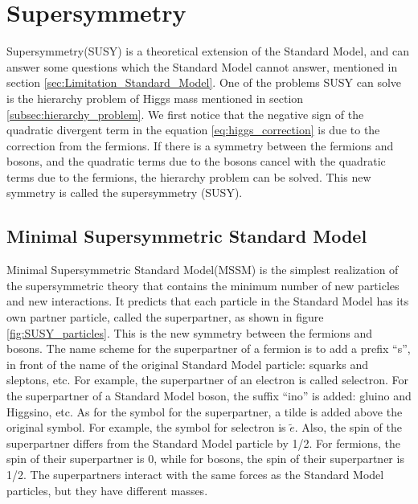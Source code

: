 \section{Supersymmetry}
Supersymmetry(SUSY) is a theoretical extension of the Standard Model, and can answer some questions which the Standard Model cannot answer, mentioned in section \ref{sec:Limitation_Standard_Model}.
One of the problems SUSY can solve is the hierarchy problem of Higgs mass mentioned in section \ref{subsec:hierarchy_problem}.
We first notice that the negative sign of the quadratic divergent term in the equation \ref{eq:higgs_correction} is due to the correction from the fermions.
If there is a symmetry between the fermions and bosons, and the quadratic terms due to the bosons cancel with the quadratic terms due to the fermions, the hierarchy problem can be solved.
This new symmetry is called the supersymmetry (SUSY).

\subsection{Minimal Supersymmetric Standard Model}
Minimal Supersymmetric Standard Model(MSSM) is the simplest realization of the supersymmetric theory that contains the minimum number of new particles and new interactions.
It predicts that each particle in the Standard Model has its own partner particle, called the superpartner, as shown in figure \ref{fig:SUSY_particles}.
This is the new symmetry between the fermions and bosons.
The name scheme for the superpartner of a fermion is to add a prefix ``s'', in front of the name of the original Standard Model particle: squarks and sleptons, etc.
For example, the superpartner of an electron is called selectron.
For the superpartner of a Standard Model boson, the suffix ``ino'' is added: gluino and Higgsino, etc.
As for the symbol for the superpartner, a tilde is added above the original symbol.
For example, the symbol for selectron is $\tilde{e}$.
Also, the spin of the superpartner differs from the Standard Model particle by 1/2.
For fermions, the spin of their superpartner is 0, while for bosons, the spin of their superpartner is 1/2.
The superpartners interact with the same forces as the Standard Model particles, but they have different masses.

